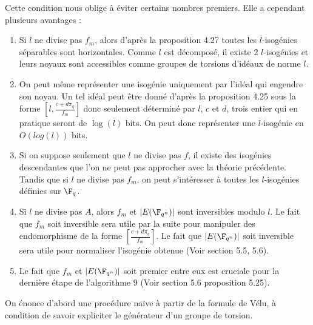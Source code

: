 Cette condition nous oblige à éviter certains nombres premiers. Elle a cependant plusieurs avantages :
\begin{enumerate}
	\item Si $l$ ne divise pas $f_{m}$, alors d'après la proposition 4.27 toutes les $l$-isogénies séparables sont horizontales. Comme $l$ est décomposé, il existe $2$ $l$-isogénies et leurs noyaux sont accessibles comme groupes de torsions d'idéaux de norme $l$. 
	\item On peut même représenter une isogénie uniquement par l'idéal qui engendre son noyau. Un tel idéal peut être donné d'après la proposition 4.25 sous la forme $\left[ l, \frac{c + d\pi_{q}}{f_{m}}\right]$ donc seulement déterminé par $l$, $c$ et $d$, trois entier qui en pratique seront de $\log(l)$ bits. On peut donc représenter une $l$-isogénie en $O(log(l))$ bits. 
	\item Si on suppose seulement que $l$ ne divise pas $f$, il existe des isogénies descendantes que l'on ne peut pas approcher avec la théorie précédente. Tandis que si $l$ ne divise pas $f_{m}$, on peut s’intéresser à toutes les $l$-isogénies définies sur $\F_{q}$.
	\item Si $l$ ne divise pas $A$, alors $f_{m}$ et $|E(\F_{q^{n}})|$ sont inversibles modulo $l$. Le fait que $f_{m}$ soit inversible sera utile par la suite pour manipuler des endomorphisme de la forme $\left[ \frac{c + d\pi_{q}}{f_{m}}\right] $. Le fait que $|E(\F_{q^{n}})|$ soit inversible sera utile pour normaliser l'isogénie obtenue (Voir section 5.5, 5.6).
	\item Le fait que $f_{m}$ et $|E(\F_{q^{n}})|$ soit premier entre eux est cruciale pour la dernière étape de l'algorithme $9$ (Voir section 5.6 proposition 5.25). 
\end{enumerate}

On énonce d'abord une procédure naïve à partir de la formule de Vélu, à condition de savoir expliciter le générateur d'un groupe de torsion.

